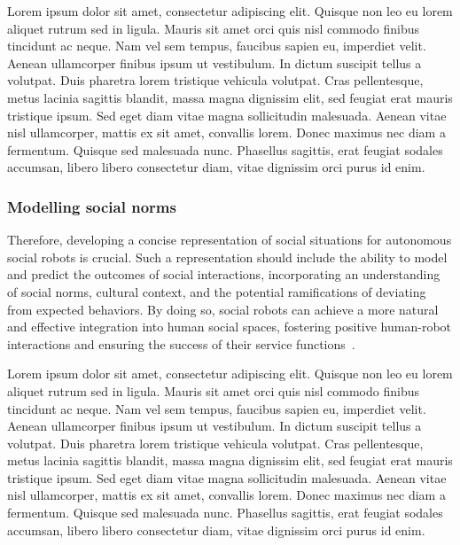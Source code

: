 \begin{rewrite}
Lorem ipsum dolor sit amet, consectetur adipiscing elit. Quisque non leo eu
lorem aliquet rutrum sed in ligula. Mauris sit amet orci quis nisl commodo
finibus tincidunt ac neque. Nam vel sem tempus, faucibus sapien eu,
imperdiet velit. Aenean ullamcorper finibus ipsum ut vestibulum. In dictum
suscipit tellus a volutpat. Duis pharetra lorem tristique vehicula volutpat.
Cras pellentesque, metus lacinia sagittis blandit, massa magna dignissim
elit, sed feugiat erat mauris tristique ipsum. Sed eget diam vitae magna
sollicitudin malesuada. Aenean vitae nisl ullamcorper, mattis ex sit amet,
convallis lorem. Donec maximus nec diam a fermentum. Quisque sed malesuada
nunc. Phasellus sagittis, erat feugiat sodales accumsan, libero libero
consectetur diam, vitae dignissim orci purus id enim.
\end{rewrite}


\subsubsection{Modelling social norms}

Therefore, developing a concise representation of social situations for
autonomous social robots is crucial. Such a representation should include the
ability to model and predict the outcomes of social interactions, incorporating
an understanding of social norms, cultural context, and the potential
ramifications of deviating from expected behaviors. By doing so, social robots
can achieve a more natural and effective integration into human social spaces,
fostering positive human-robot interactions and ensuring the success of their
service functions~\cite{gockley2005designing}.

\begin{rewrite}
Lorem ipsum dolor sit amet, consectetur adipiscing elit. Quisque non leo eu
lorem aliquet rutrum sed in ligula. Mauris sit amet orci quis nisl commodo
finibus tincidunt ac neque. Nam vel sem tempus, faucibus sapien eu,
imperdiet velit. Aenean ullamcorper finibus ipsum ut vestibulum. In dictum
suscipit tellus a volutpat. Duis pharetra lorem tristique vehicula volutpat.
Cras pellentesque, metus lacinia sagittis blandit, massa magna dignissim
elit, sed feugiat erat mauris tristique ipsum. Sed eget diam vitae magna
sollicitudin malesuada. Aenean vitae nisl ullamcorper, mattis ex sit amet,
convallis lorem. Donec maximus nec diam a fermentum. Quisque sed malesuada
nunc. Phasellus sagittis, erat feugiat sodales accumsan, libero libero
consectetur diam, vitae dignissim orci purus id enim.
\end{rewrite}



